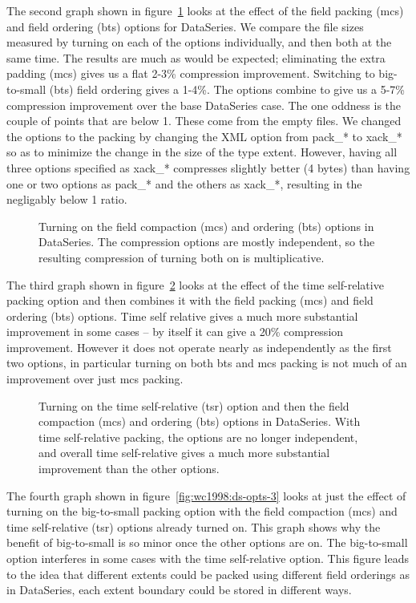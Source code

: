 The second graph shown in figure~\ref{fig:wc1998:ds-opts-1} looks
at the effect of the field packing (mcs) and field ordering (bts)
options for DataSeries.  We compare the file sizes measured by turning
on each of the options individually, and then both at the same time.
The results are much as would be expected; eliminating the extra
padding (mcs) gives us a flat 2-3\% compression improvement.
Switching to big-to-small (bts) field ordering gives a 1-4\%.  The
options combine to give us a 5-7\% compression improvement over the
base DataSeries case.  The one oddness is the couple of points that
are below 1.  These come from the empty files.  We changed the options
to the packing by changing the XML option from pack\_* to xack\_* so
as to minimize the change in the size of the type extent.  However,
having all three options specified as xack\_* compresses slightly
better (4 bytes) than having one or two options as pack\_* and the
others as xack\_*, resulting in the negligably below 1 ratio.

\begin{figure}
\caption{Turning on the field compaction (mcs) and ordering (bts) options
in DataSeries.  The compression options are mostly independent, so the
resulting compression of turning both on is multiplicative.}
\label{fig:wc1998:ds-opts-1}
\end{figure}

The third graph shown in figure~\ref{fig:wc1998:ds-opts-2} looks
at the effect of the time self-relative packing option and then
combines it with the field packing (mcs) and field ordering (bts)
options.  Time self relative gives a much more substantial improvement
in some cases -- by itself it can give a 20\% compression improvement.
However it does not operate nearly as independently as the first two
options, in particular turning on both bts and mcs packing is not much
of an improvement over just mcs packing.

\begin{figure}
\caption{Turning on the time self-relative (tsr) option and then the
field compaction (mcs) and ordering (bts) options in DataSeries.
With time self-relative packing, the options are no longer independent,
and overall time self-relative gives a much more substantial improvement
than the other options.}
\label{fig:wc1998:ds-opts-2}
\end{figure}

The fourth graph shown in figure~\ref{fig:wc1998:ds-opts-3} looks at
just the effect of turning on the big-to-small packing option with the
field compaction (mcs) and time self-relative (tsr) options already
turned on.  This graph shows why the benefit of big-to-small is so
minor once the other options are on.  The big-to-small option
interferes in some cases with the time self-relative option.  This
figure leads to the idea that different extents could be packed using
different field orderings as in DataSeries, each extent boundary could
be stored in different ways.

